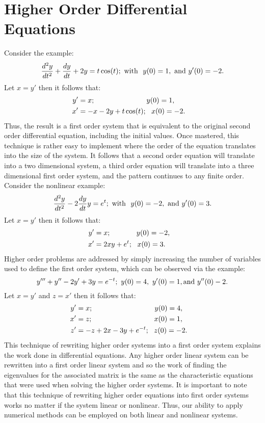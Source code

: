 \documentclass[twoside]{article}
\def\ds{\displaystyle}
\begin{document}
\section{Higher Order Differential Equations}
Consider the example: 
$$\frac {d^2y}{dt^2} + \frac {dy}{dt} + 2y = t\cos(t); \ {\rm with}\ \ y(0)=1, \ {\rm and} \ y'(0)=-2.$$
Let $\ds x = y'$ then it follows that:
\begin{align*}
    y' &= x;  \hspace{1.0in} y(0)=1,\cr
    x' &= -x - 2y + t\cos(t); \ \ x(0)=-2.
\end{align*}
Thus, the result is a first order system that is equivalent to the original second order differential equation, including the initial values. Once mastered, this technique is rather easy to implement where the order of the equation translates into the size of the system. It follows that a second order equation will translate into a two dimensional system, a third order equation will translate into a three dimensional first order system, and the pattern continues to any finite order. Consider the nonlinear example:
$$\frac {d^2y}{dt^2} - 2 \frac {dy}{dt}y = e^t; \ {\rm with}\ \ y(0)=-2, \ {\rm and} \ y'(0)= 3.$$
Let $\ds x = y'$ then it follows that:
\begin{align*}
    y' &= x;  \hspace{.5in} y(0)=-2,\cr
    x' &= 2xy +e^t ; \ \ x(0)= 3.
\end{align*}
Higher order problems are addressed by simply increasing the number of variables used to define the first order system, which can be observed via the example:
$$y''' +y'' -2y' +3y = e^{-t}; \ y(0)=4, \ y'(0)=1, {\rm and} \ y''(0)-2.$$
Let $\ds x=y'$ and $\ds z = x'$ then it follows that:
\begin{align*}
    y' &= x;  \hspace{1.2in} y(0) = 4, \cr
    x' &= z; \hspace{1.2in} x(0) = 1, \cr
    z' &= -z + 2x -3y + e^{-t} ; \ \ z(0)=-2.
\end{align*}
This technique of rewriting higher order systems into a first order system explains the work done in differential equations. Any higher order linear system can be rewritten into a first order linear system and so the work of finding the eigenvalues for the associated matrix is the same as the characteristic equations that were used when solving the higher order systems. It is important to note that this technique of rewriting higher order equations into first order systems works no matter if the system linear or nonlinear. Thus, our ability to apply numerical methods can be employed on both linear and nonlinear systems. 
\end{document}
